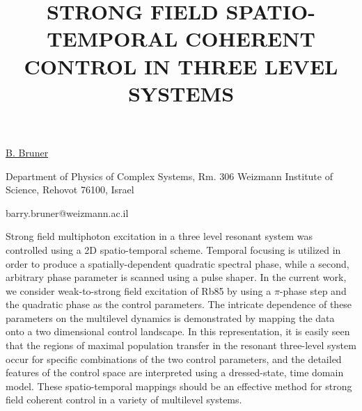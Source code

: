 \title{STRONG FIELD SPATIO-TEMPORAL COHERENT CONTROL IN THREE LEVEL SYSTEMS}

\underline{B. Bruner} 

{\normalsize{\vspace{-4mm}
Department of Physics of Complex Systems, Rm. 306 Weizmann Institute
of Science, Rehovot 76100, Israel

\email barry.bruner@weizmann.ac.il}}

Strong field multiphoton excitation in a three level resonant system was controlled using a 2D spatio-temporal scheme.  Temporal focusing is utilized in order to produce a spatially-dependent quadratic spectral phase, while a second, arbitrary phase parameter is scanned using a pulse shaper.  In the current work, we consider weak-to-strong field excitation of Rb85 by using a $\pi$-phase step and the quadratic phase as the control parameters. The intricate dependence of these parameters on the multilevel dynamics is demonstrated by mapping the data onto a two dimensional control landscape.  In this representation, it is easily seen that the regions of maximal population transfer in the resonant three-level system occur for specific combinations of the two control parameters, and the detailed features of the control space are interpreted using a dressed-state, time domain model. These spatio-temporal mappings should be an effective method for strong field coherent control in a variety of multilevel systems.

\vspace{\baselineskip}
